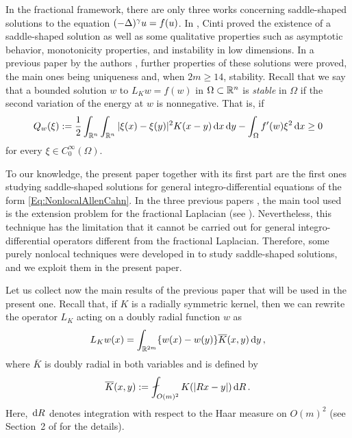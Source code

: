 In the fractional framework, there are only three works concerning saddle-shaped solutions to the equation $(-\Delta)^\gamma u = f(u)$. In  \cite{Cinti-Saddle,Cinti-Saddle2}, Cinti proved the existence of a saddle-shaped solution as well as some qualitative properties such as asymptotic behavior, monotonicity properties, and instability in low dimensions. In a previous paper by the authors \cite{Felipe-Sanz-Perela:SaddleFractional}, further properties of these solutions were proved, the main ones being uniqueness and, when $2m\geq 14$, stability. Recall that we say that a bounded solution $w$ to $L_K w = f(w)$ in $\Omega\subset \mathbb{R}^n$ is \emph{stable} in $\Omega$ if the second variation of the energy at $w$ is nonnegative. That is, if
\begin{equation}
\label{Eq:StablityCondition}  
Q_w(\xi) := \dfrac{1}{2} \int_{\mathbb{R}^n} \int_{\mathbb{R}^n} |\xi (x) - \xi(y)|^2 K(x - y) \,\mathrm{d} x \,\mathrm{d} y - \int_{\Omega} f'(w) \xi^2 \,\mathrm{d} x \geq 0
\end{equation}
for every $\xi \in C^\infty_0 (\Omega)$.


To our knowledge, the present paper together with its first part \cite{FelipeSanz-Perela:IntegroDifferentialI} are the first ones studying saddle-shaped solutions for general integro-differential equations of the form \eqref{Eq:NonlocalAllenCahn}. In the three previous papers \cite{Cinti-Saddle, Cinti-Saddle2, Felipe-Sanz-Perela:SaddleFractional}, the main tool used is the extension problem for the fractional Laplacian (see \cite{CaffarelliSilvestre}). Nevertheless, this technique has the limitation that it cannot be carried out for general integro-differential operators different from the fractional Laplacian. Therefore, some purely nonlocal techniques were developed in \cite{FelipeSanz-Perela:IntegroDifferentialI} to study saddle-shaped solutions, and we exploit them in the present paper.

Let us collect now the main results of the previous paper \cite{FelipeSanz-Perela:IntegroDifferentialI} that will be used in the present one. Recall that, if $K$ is a radially symmetric kernel, then we can rewrite the operator $L_K$ acting on a doubly radial function $w$ as
$$
L_K w(x) = \int_{\mathbb{R}^{2m}} \{w(x) - w(y)\} \overline{K}(x,y) \,\mathrm{d} y\,,
$$
where $\overline{K}$ is doubly radial in both variables and is defined by
\begin{equation}
\label{Eq:KbarDef}
\overline{K}(x,y) := \average_{O(m)^2} K(|Rx - y|)\d R\,.
\end{equation}
Here, $\,\mathrm{d} R$ denotes integration with respect to the Haar measure on $O(m)^2$ (see Section~2 of \cite{FelipeSanz-Perela:IntegroDifferentialI} for the details).

